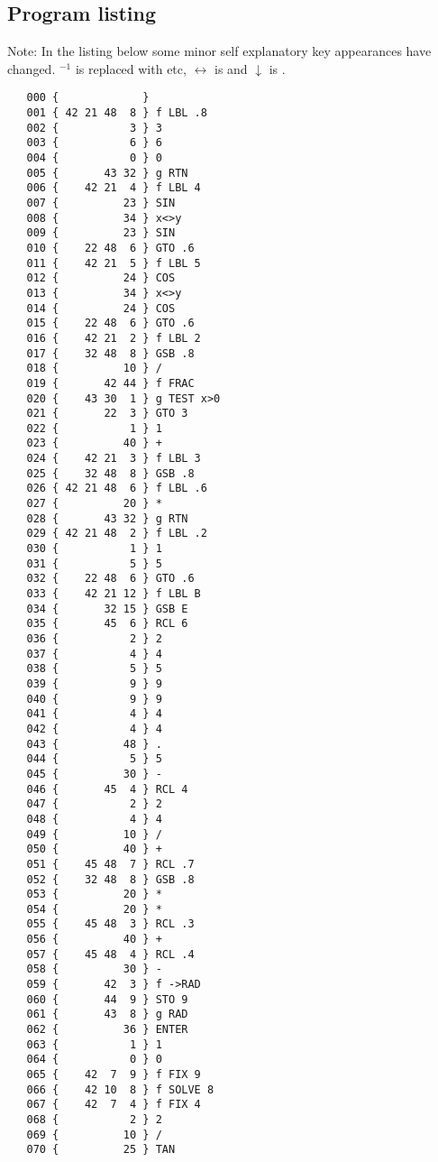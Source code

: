 \documentclass[english,a4paper,onepage, 10pt]{scrbook}
\begin{document}
\subsection{Program listing}

Note: In the listing below some minor self explanatory key appearances have changed.  $^{-1}$ is replaced with  etc, $\leftrightarrow$ is  and $\downarrow$ is .
\begin{multicols}{2}
\begin{lstlisting}
   000 {             } 
   001 { 42 21 48  8 } f LBL .8
   002 {           3 } 3
   003 {           6 } 6
   004 {           0 } 0
   005 {       43 32 } g RTN
   006 {    42 21  4 } f LBL 4
   007 {          23 } SIN
   008 {          34 } x<>y
   009 {          23 } SIN
   010 {    22 48  6 } GTO .6
   011 {    42 21  5 } f LBL 5
   012 {          24 } COS
   013 {          34 } x<>y
   014 {          24 } COS
   015 {    22 48  6 } GTO .6
   016 {    42 21  2 } f LBL 2
   017 {    32 48  8 } GSB .8
   018 {          10 } /
   019 {       42 44 } f FRAC
   020 {    43 30  1 } g TEST x>0
   021 {       22  3 } GTO 3
   022 {           1 } 1
   023 {          40 } +
   024 {    42 21  3 } f LBL 3
   025 {    32 48  8 } GSB .8
   026 { 42 21 48  6 } f LBL .6
   027 {          20 } *
   028 {       43 32 } g RTN
   029 { 42 21 48  2 } f LBL .2
   030 {           1 } 1
   031 {           5 } 5
   032 {    22 48  6 } GTO .6
   033 {    42 21 12 } f LBL B
   034 {       32 15 } GSB E
   035 {       45  6 } RCL 6
   036 {           2 } 2
   037 {           4 } 4
   038 {           5 } 5
   039 {           9 } 9
   040 {           9 } 9
   041 {           4 } 4
   042 {           4 } 4
   043 {          48 } .
   044 {           5 } 5
   045 {          30 } -
   046 {       45  4 } RCL 4
   047 {           2 } 2
   048 {           4 } 4
   049 {          10 } /
   050 {          40 } +
   051 {    45 48  7 } RCL .7
   052 {    32 48  8 } GSB .8
   053 {          20 } *
   054 {          20 } *
   055 {    45 48  3 } RCL .3
   056 {          40 } +
   057 {    45 48  4 } RCL .4
   058 {          30 } -
   059 {       42  3 } f ->RAD
   060 {       44  9 } STO 9
   061 {       43  8 } g RAD
   062 {          36 } ENTER
   063 {           1 } 1
   064 {           0 } 0
   065 {    42  7  9 } f FIX 9
   066 {    42 10  8 } f SOLVE 8
   067 {    42  7  4 } f FIX 4
   068 {           2 } 2
   069 {          10 } /
   070 {          25 } TAN

\end{lstlisting}
\end{multicols}
\end{document}
